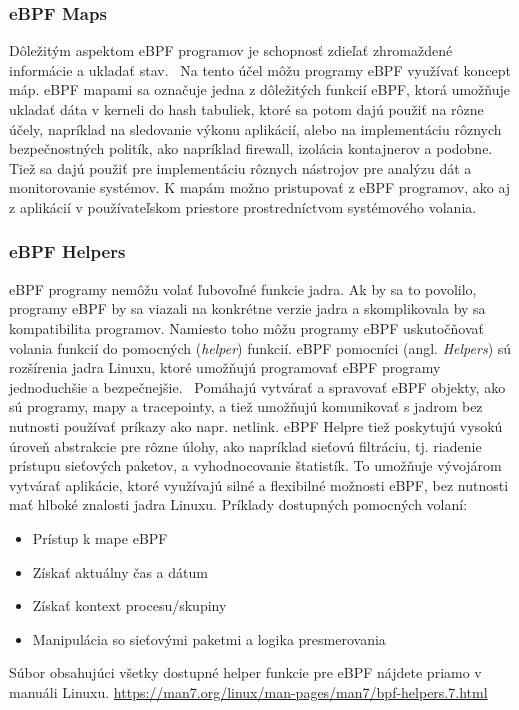 \subsubsection{eBPF Maps}
Dôležitým aspektom eBPF programov je schopnosť zdieľať zhromaždené informácie a ukladať stav.~\cite{eBPF} Na tento účel môžu programy eBPF využívať koncept máp. 
eBPF mapami sa označuje jedna z dôležitých funkcií eBPF, ktorá umožňuje ukladať dáta v kerneli do hash tabuliek, ktoré sa potom dajú použiť na rôzne účely, 
napríklad na sledovanie výkonu aplikácií, alebo na implementáciu rôznych bezpečnostných politík, ako napríklad firewall, izolácia kontajnerov a podobne. 
Tiež sa dajú použiť pre implementáciu rôznych nástrojov pre analýzu dát a monitorovanie systémov. K mapám možno pristupovať z eBPF programov, 
ako aj z aplikácií v používateľskom priestore prostredníctvom systémového volania.

\subsubsection{eBPF Helpers}
eBPF programy nemôžu volať ľubovoľné funkcie jadra. Ak by sa to povolilo, programy eBPF by sa viazali na konkrétne verzie jadra a skomplikovala by sa 
kompatibilita programov. Namiesto toho môžu programy eBPF uskutočňovať volania funkcií do pomocných (\emph{helper}) funkcií. eBPF pomocníci (angl. \emph{Helpers}) 
sú rozšírenia jadra Linuxu, ktoré umožňujú programovať eBPF programy jednoduchšie a bezpečnejšie.~\cite{eBPF} Pomáhajú vytvárať a spravovať eBPF objekty, 
ako sú programy, mapy a tracepointy, a tiež umožňujú komunikovať s jadrom bez nutnosti používať príkazy ako napr. netlink. eBPF Helpre tiež 
poskytujú vysokú úroveň abstrakcie pre rôzne úlohy, ako napríklad sieťovú filtráciu, tj. riadenie prístupu sieťových paketov, a vyhodnocovanie štatistík. 
To umožňuje vývojárom vytvárať aplikácie, ktoré využívajú silné a flexibilné možnosti eBPF, bez nutnosti mať hlboké znalosti jadra Linuxu.
Príklady dostupných pomocných volaní:
\begin{itemize}
\item Prístup k mape eBPF
\item Získať aktuálny čas a dátum
\item Získať kontext procesu/skupiny
\item Manipulácia so sieťovými paketmi a logika presmerovania
\end{itemize}

Súbor obsahujúci všetky dostupné helper funkcie pre eBPF nájdete priamo v manuáli Linuxu. 
\url{https://man7.org/linux/man-pages/man7/bpf-helpers.7.html}

